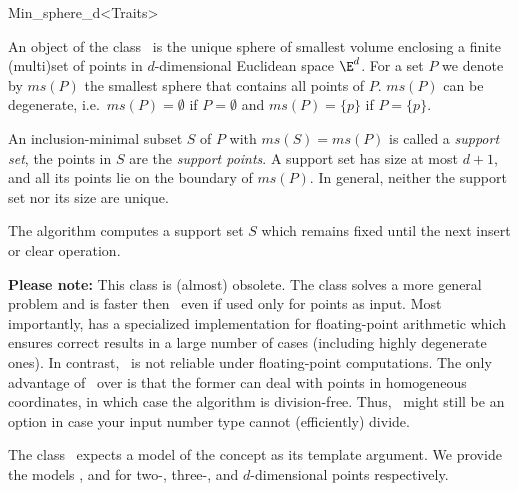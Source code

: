 
    \begin{ccRefClass}{Min_sphere_d<Traits>}
\cgalSetMinSphereLayout

\ccDefinition

An object of the class \ccRefName\ is the unique sphere of
smallest volume enclosing a finite (multi)set of points in $d$-dimensional
Euclidean space $\E^d$. For a set $P$ we denote by $ms(P)$ the
smallest sphere that contains all points of $P$. $ms(P)$ can
be degenerate, i.e.\ $ms(P)=\emptyset$
if $P=\emptyset$ and $ms(P)=\{p\}$ if
$P=\{p\}$.

An inclusion-minimal subset $S$ of $P$ with $ms(S)=ms(P)$ is called a
\emph{support set}, the points in $S$ are the \emph{support points}.
A support set has size at most $d+1$, and all its points lie on the
boundary of $ms(P)$. In general, neither the support set nor its size
are unique.

The algorithm
computes a support set $S$ which remains fixed until the next insert
or clear operation.

\textbf{Please note:} This class is (almost) obsolete. The class
 solves a more general problem
and is faster then \ccRefName\, even if used only for points
as input. Most importantly,  has
a specialized implementation for floating-point arithmetic which
ensures correct results in a large number of cases (including
highly degenerate ones). In contrast, \ccRefName\ is not reliable
under floating-point computations. The only advantage of 
\ccRefName\ over  is that the
former can deal with points in homogeneous coordinates, in which 
case the algorithm is division-free. Thus, \ccRefName\ might still
be an option in case your input number type cannot (efficiently) 
divide.


    \ccRequirements
    \ccIndexRequirements

    The class \ccRefName\ expects a model of the concept
     as its template argument.
      We provide the models ,
       and 
    for two-, three-, and $d$-dimensional points respectively.


\end{ccRefClass}
